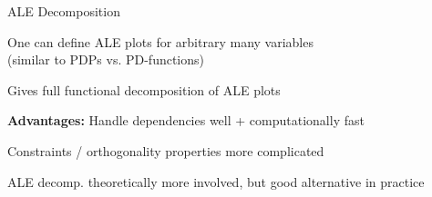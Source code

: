 \documentclass[10pt,compress,t,notes=noshow, xcolor=table]{beamer}
\begin{document}
\begin{framei}[align=top]{ALE Decomposition}
\item One can define ALE plots for arbitrary many variables \\
(similar to PDPs vs. PD-functions)
\item[$\rightarrow$] Gives full functional decomposition of ALE plots
\pause
\item \textbf{Advantages:} Handle dependencies well + computationally fast
\item Constraints / orthogonality properties more complicated
\item[$\implies$] ALE decomp. theoretically more involved, but good alternative in practice
\end{framei}

    


    
\end{document}
